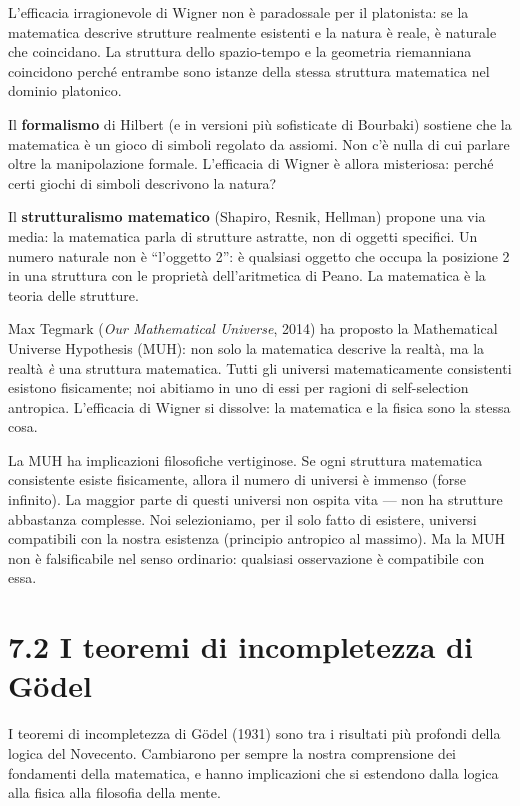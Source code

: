 \documentclass[11.5pt,a4paper,openany]{book}
\theoremstyle{remark}
\begin{document}
L'efficacia irragionevole di Wigner non è paradossale per il platonista: se la matematica descrive strutture realmente esistenti e la natura è reale, è naturale che coincidano. La struttura dello spazio-tempo e la geometria riemanniana coincidono perché entrambe sono istanze della stessa struttura matematica nel dominio platonico.

Il \textbf{formalismo} di Hilbert (e in versioni più sofisticate di Bourbaki) sostiene che la matematica è un gioco di simboli regolato da assiomi. Non c'è nulla di cui parlare oltre la manipolazione formale. L'efficacia di Wigner è allora misteriosa: perché certi giochi di simboli descrivono la natura?

Il \textbf{strutturalismo matematico} (Shapiro, Resnik, Hellman) propone una via media: la matematica parla di strutture astratte, non di oggetti specifici. Un numero naturale non è ``l'oggetto 2'': è qualsiasi oggetto che occupa la posizione 2 in una struttura con le proprietà dell'aritmetica di Peano. La matematica è la teoria delle strutture.

Max Tegmark (\textit{Our Mathematical Universe}, 2014) ha proposto la Mathematical Universe Hypothesis (MUH): non solo la matematica descrive la realtà, ma la realtà \textit{è} una struttura matematica. Tutti gli universi matematicamente consistenti esistono fisicamente; noi abitiamo in uno di essi per ragioni di self-selection antropica. L'efficacia di Wigner si dissolve: la matematica e la fisica sono la stessa cosa.

La MUH ha implicazioni filosofiche vertiginose. Se ogni struttura matematica consistente esiste fisicamente, allora il numero di universi è immenso (forse infinito). La maggior parte di questi universi non ospita vita --- non ha strutture abbastanza complesse. Noi selezioniamo, per il solo fatto di esistere, universi compatibili con la nostra esistenza (principio antropico al massimo). Ma la MUH non è falsificabile nel senso ordinario: qualsiasi osservazione è compatibile con essa.

\section{7.2 I teoremi di incompletezza di Gödel}

I teoremi di incompletezza di Gödel (1931) sono tra i risultati più profondi della logica del Novecento. Cambiarono per sempre la nostra comprensione dei fondamenti della matematica, e hanno implicazioni che si estendono dalla logica alla fisica alla filosofia della mente.
\end{document}
